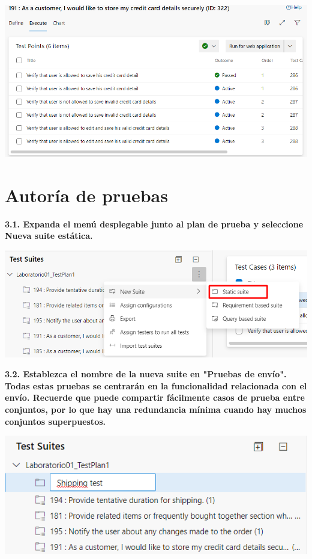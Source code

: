 \documentclass{article}
\begin{document}
    \begin{center}
		\includegraphics[width=14cm]{./images/2.19} 
	\end{center}
	

\section{
Autoría de pruebas}

\textbf{3.1. Expanda el menú desplegable junto al plan de prueba y seleccione Nueva suite estática.}

    \begin{center}
		\includegraphics[width=14cm]{./images/3.1} 
	\end{center}
		
\newpage
\textbf{3.2.  
Establezca el nombre de la nueva suite en "Pruebas de envío". Todas estas pruebas se centrarán en la funcionalidad relacionada con el envío. Recuerde que puede compartir fácilmente casos de prueba entre conjuntos, por lo que hay una redundancia mínima cuando hay muchos conjuntos superpuestos.}

    \begin{center}
		\includegraphics[width=14cm]{./images/3.2} 
	\end{center}
		
\end{document}

